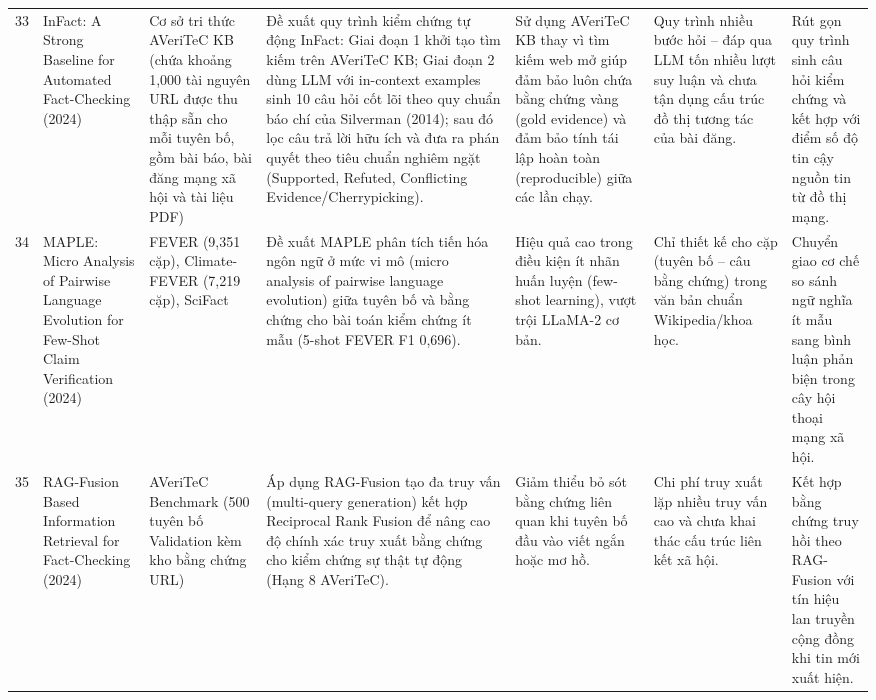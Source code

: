 \documentclass[11pt,a4paper]{extreport}
\begin{document}
\begin{landscape}
\begin{longtable}{@{}C{0.6cm}p{3.6cm}p{2.7cm}p{4.8cm}p{3.6cm}p{3.6cm}p{3.6cm}@{}}
33 & InFact: A Strong Baseline for Automated Fact-Checking (2024) \cite{noauthor_infact_2024} & Cơ sở tri thức AVeriTeC KB (chứa khoảng 1,000 tài nguyên URL được thu thập sẵn cho mỗi tuyên bố, gồm bài báo, bài đăng mạng xã hội và tài liệu PDF) & Đề xuất quy trình kiểm chứng tự động InFact: Giai đoạn 1 khởi tạo tìm kiếm trên AVeriTeC KB; Giai đoạn 2 dùng LLM với in-context examples sinh 10 câu hỏi cốt lõi theo quy chuẩn báo chí của Silverman (2014); sau đó lọc câu trả lời hữu ích và đưa ra phán quyết theo tiêu chuẩn nghiêm ngặt (Supported, Refuted, Conflicting Evidence/Cherrypicking). & Sử dụng AVeriTeC KB thay vì tìm kiếm web mở giúp đảm bảo luôn chứa bằng chứng vàng (gold evidence) và đảm bảo tính tái lập hoàn toàn (reproducible) giữa các lần chạy. & Quy trình nhiều bước hỏi -- đáp qua LLM tốn nhiều lượt suy luận và chưa tận dụng cấu trúc đồ thị tương tác của bài đăng. & Rút gọn quy trình sinh câu hỏi kiểm chứng và kết hợp với điểm số độ tin cậy nguồn tin từ đồ thị mạng. \\ 

34 & MAPLE: Micro Analysis of Pairwise Language Evolution for Few-Shot Claim Verification (2024) \cite{noauthor_maple_2024} & FEVER (9,351 cặp), Climate-FEVER (7,219 cặp), SciFact & Đề xuất MAPLE phân tích tiến hóa ngôn ngữ ở mức vi mô (micro analysis of pairwise language evolution) giữa tuyên bố và bằng chứng cho bài toán kiểm chứng ít mẫu (5-shot FEVER F1 0,696). & Hiệu quả cao trong điều kiện ít nhãn huấn luyện (few-shot learning), vượt trội LLaMA-2 cơ bản. & Chỉ thiết kế cho cặp (tuyên bố -- câu bằng chứng) trong văn bản chuẩn Wikipedia/khoa học. & Chuyển giao cơ chế so sánh ngữ nghĩa ít mẫu sang bình luận phản biện trong cây hội thoại mạng xã hội. \\ 

35 & RAG-Fusion Based Information Retrieval for Fact-Checking (2024) \cite{noauthor_rag-fusion_2024} & AVeriTeC Benchmark (500 tuyên bố Validation kèm kho bằng chứng URL) & Áp dụng RAG-Fusion tạo đa truy vấn (multi-query generation) kết hợp Reciprocal Rank Fusion để nâng cao độ chính xác truy xuất bằng chứng cho kiểm chứng sự thật tự động (Hạng 8 AVeriTeC). & Giảm thiểu bỏ sót bằng chứng liên quan khi tuyên bố đầu vào viết ngắn hoặc mơ hồ. & Chi phí truy xuất lặp nhiều truy vấn cao và chưa khai thác cấu trúc liên kết xã hội. & Kết hợp bằng chứng truy hồi theo RAG-Fusion với tín hiệu lan truyền cộng đồng khi tin mới xuất hiện. \\ 


\end{longtable}
\end{landscape}
\end{document}
